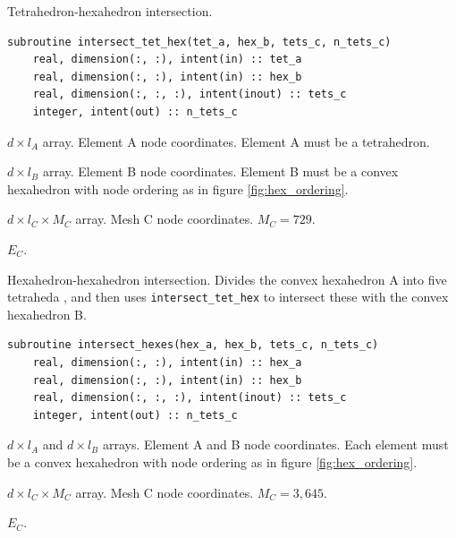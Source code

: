 \documentclass{article}
\begin{document}
\noindent Tetrahedron-hexahedron intersection.

\begin{lstlisting}[language=FORTRAN]
  subroutine intersect_tet_hex(tet_a, hex_b, tets_c, n_tets_c)
    real, dimension(:, :), intent(in) :: tet_a
    real, dimension(:, :), intent(in) :: hex_b
    real, dimension(:, :, :), intent(inout) :: tets_c
    integer, intent(out) :: n_tets_c
\end{lstlisting}

\begin{description}[font=\ttfamily\bfseries,leftmargin=2.2\parindent,labelindent=1.7\parindent,noitemsep]
  \item[tet\_a] $d \times l_A$ array. Element A node coordinates. Element A must
    be a tetrahedron.
  \item[hex\_b] $d \times l_B$ array. Element B node coordinates. Element B must
    be a convex hexahedron with node ordering as in figure
    \ref{fig:hex_ordering}.
  \item[tets\_c] $d \times l_C \times M_C$ array. Mesh C node coordinates.
    $M_C = 729$.
  \item[n\_tets\_c] $E_C$.
\end{description}

\noindent Hexahedron-hexahedron intersection. Divides the convex hexahedron A
into five tetraheda \citep[as in][figure 2.29]{wenger2013}, and then uses
\verb+intersect_tet_hex+ to intersect these with the convex hexahedron B.

\begin{lstlisting}[language=FORTRAN]
  subroutine intersect_hexes(hex_a, hex_b, tets_c, n_tets_c)
    real, dimension(:, :), intent(in) :: hex_a
    real, dimension(:, :), intent(in) :: hex_b
    real, dimension(:, :, :), intent(inout) :: tets_c
    integer, intent(out) :: n_tets_c
\end{lstlisting}

\begin{description}[font=\ttfamily\bfseries,leftmargin=2.2\parindent,labelindent=1.7\parindent,noitemsep]
  \item[hex\_a, hex\_b] $d \times l_A$ and $d \times l_B$ arrays. Element A and
    B node coordinates. Each element must be a convex hexahedron with node
    ordering as in figure \ref{fig:hex_ordering}.
  \item[tets\_c] $d \times l_C \times M_C$ array. Mesh C node coordinates.
    $M_C = 3,645$.
  \item[n\_tets\_c] $E_C$.
\end{description}
\end{document}
